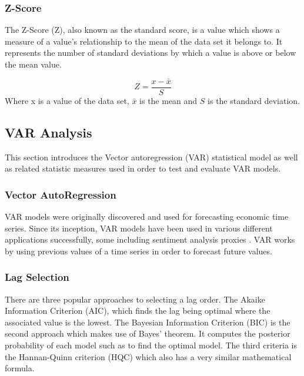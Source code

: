 \subsubsection{Z-Score}

The Z-Score (Z), also known as the standard score, is a value which shows a measure of a value's relationship to the mean of the data set it belongs to. It represents the number of standard deviations by which a value is above or below the mean value.

\begin{equation}
    Z = \frac{x - \bar{x}}{S}
\end{equation}
Where x is a value of the data set, $\bar{x}$ is the mean and $S$ is the standard deviation.

\subsection{VAR Analysis}\label{chap:var lit rv}

This section introduces the Vector autoregression (VAR) statistical model as well as related statistic measures used in order to test and evaluate VAR models.

\subsubsection{Vector AutoRegression}

VAR models were originally discovered and used for forecasting economic time series. Since its inception, VAR models have been used in various different applications successfully, some including sentiment analysis proxies \citep{georgoula2015using,zhao2015computational}. VAR works by using previous values of a time series in order to forecast future values.


\subsubsection{Lag Selection}\label{chap:lag selection lr}

There are three popular approaches to selecting a lag order. The Akaike Information Criterion (AIC), which finds the lag being optimal where the associated value is the lowest. The Bayesian Information Criterion (BIC) is the second approach which makes use of Bayes' theorem. It computes the posterior probability of each model such as to find the optimal model. The third criteria is the Hannan-Quinn criterion (HQC) which also has a very similar mathematical formula.

